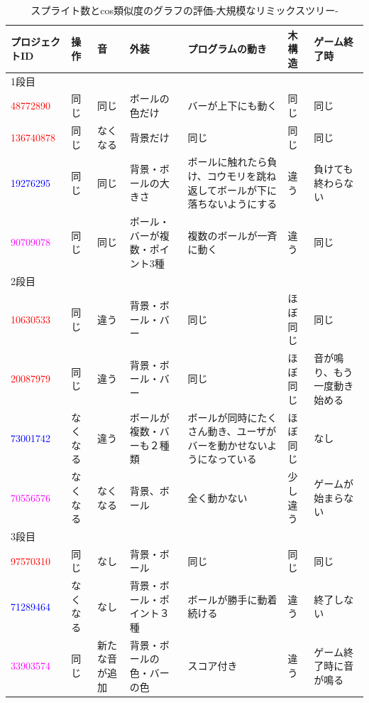 \documentclass[a4paper,10pt,onecolumn,oneside,openany]{jsbook}
\begin{document}
\begin{table}[h]
 \scriptsize
 \caption{スプライト数とcos類似度のグラフの評価-大規模なリミックスツリー-}
 \label{splite}
 \begin{center}
\begin{tabular}{|p{1.7cm}||p{1cm}|p{1cm}|p{1.7cm}|p{2cm}|p{1cm}|p{1.7cm}|} \hline

プロジェクトID & 操作 & 音 & 外装 & プログラムの動き & 木構造 & ゲーム終了時 \\ \hline \hline
1段目 &  &  &  &  &  &  \\ \hline
\textcolor{red}{48772890} & 同じ & 同じ & ボールの色だけ & バーが上下にも動く & 同じ & 同じ \\ \hline
\textcolor{red}{136740878} & 同じ & なくなる & 背景だけ & 同じ & 同じ & 同じ \\ \hline
\textcolor{blue}{19276295} & 同じ & 同じ & 背景・ボールの大きさ & ボールに触れたら負け、コウモリを跳ね返してボールが下に落ちないようにする & 違う & 負けても終わらない \\ \hline
\textcolor{magenta}{90709078} & 同じ & 同じ & ボール・バーが複数・ポイント3種 & 複数のボールが一斉に動く & 違う & 同じ \\ \hline

2段目 &  &  &  &  &  &  \\ \hline
\textcolor{red}{10630533} & 同じ & 違う & 背景・ボール・バー & 同じ & ほぼ同じ & 同じ \\ \hline
\textcolor{red}{20087979} & 同じ & 違う & 背景・ボール・バー & 同じ & ほぼ同じ & 音が鳴り、もう一度動き始める \\ \hline
\textcolor{blue}{73001742} & なくなる & 違う & ボールが複数・バーも２種類 & ボールが同時にたくさん動き、ユーザがバーを動かせないようになっている & ほぼ同じ & なし \\ \hline
\textcolor{magenta}{70556576} & なくなる & なくなる & 背景、ボール & 全く動かない & 少し違う & ゲームが始まらない \\ \hline

3段目 &  &  &  &  &  &  \\ \hline
\textcolor{red}{97570310} & 同じ & なし & 背景・ボール & 同じ & 同じ & 同じ \\ \hline
\textcolor{blue}{71289464} & なくなる & なし & 背景・ボール・ポイント３種 & ボールが勝手に動着続ける & 違う & 終了しない \\ \hline
\textcolor{magenta}{33903574} & 同じ & 新たな音が追加 & 背景・ボールの色・バーの色 & スコア付き & 違う & ゲーム終了時に音が鳴る \\ \hline


\end{tabular}
\end{center}
\end{table}
\end{document}
